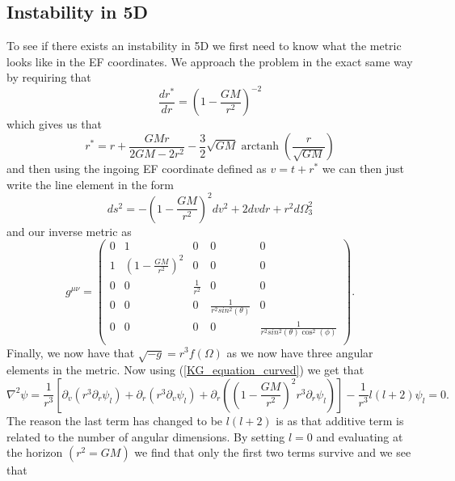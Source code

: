 \documentclass[12pt]{article}
\numberwithin{equation}{section}
\numberwithin{figure}{section}
\DeclareMathOperator\arctanh{arctanh}
\begin{document}
\subsection{Instability in 5D} %
\label{sub:instability_in_5d}
To see if there exists an instability in 5D we first need to know what the metric looks like in the EF coordinates. We approach the problem in the exact same way by requiring that 
\begin{equation}
	\frac{dr^{*}}{dr}=\left(1- \frac{GM}{r^{2}}\right)^{-2}
\end{equation}
which gives us that 
\begin{equation}
	r^{*}=r+\frac{GMr}{2GM-2r^{2}}-\frac{3}{2}\sqrt{GM}\arctanh\left(\frac{r}{\sqrt{GM}}\right)
\end{equation}
and then using the ingoing EF coordinate defined as $v=t+r^{*}$ we can then just write the line element in the form
\begin{equation}
	ds^{2}=-\left(1- \frac{GM}{r^{2}}\right)^{2}dv^{2}+2dvdr+r^{2}d\Omega^{2}_{3}
\end{equation}
and our inverse metric as 
\begin{equation}
	g^{\mu\nu}=
	\begin{pmatrix}
		0 & 1 & 0 & 0 & 0\\
		1 & (1- \frac{GM}{r^{2}})^{2} & 0 & 0& 0\\
		0 & 0 & \frac{1}{r^{2}} & 0& 0\\
		0 & 0 & 0 & \frac{1}{r^{2}sin^{2}(\theta)}& 0\\
		0 & 0 & 0 & 0 & \frac{1}{r^{2}sin^{2}(\theta)\cos^{2}(\phi)}\\
	\end{pmatrix}.
\end{equation}
Finally, we now have that $\sqrt{-g}=r^{3}f(\Omega)$ as we now have three angular elements in the metric. Now using (\ref{KG_equation_curved}) we get that
\begin{equation}
	\nabla^{2}\psi=\frac{1}{r^{3}}\left[\partial_{v}\left(r^{3}\partial_{r}\psi_{l}\right)	+\partial_{r}\left(r^{3}\partial_{v}\psi_{l}\right) + \partial_{r}\left(\left(1- \frac{GM}{r^{2}}\right)^{2}r^{3}\partial_{r}\psi_{l}\right) \right]- \frac{1}{r^{3}}l(l+2)\psi_{l}=0. \label{eq:5d_rn_kg}
\end{equation}
The reason the last term has changed to be $l(l+2)$ is as that additive term is related to the number of angular dimensions. By setting $l=0$ and evaluating at the horizon $(r^{2}=GM)$ we find that only the first two terms survive and we see that
\end{document}
